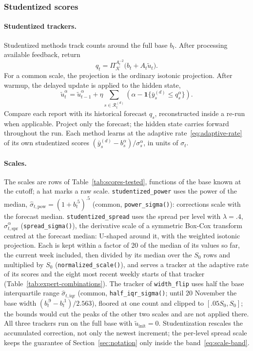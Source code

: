 \documentclass[11pt,a4paper]{article}
\newcommand{\K}{\mathcal{K}}
\newcommand{\ind}{\mathbf{1}}
\theoremstyle{definition}
\theoremstyle{remark}
\begin{document}
\subsubsection{Studentized scores}
\label{sec:studentized-code-updates}
\paragraph{Studentized trackers.}
Studentized methods track counts around the full base $b_t$. After
processing available feedback, return
\begin{equation}
 q_t=\Pi_\K^{A_t^{-2}}\bigl(b_t+A_t\tilde u_t\bigr).
 \label{eq:studentized-implementation}
\end{equation}
For a common scale, the projection is the ordinary isotonic projection.
After warmup, the delayed update is applied to the hidden state,
\begin{equation}
 \tilde u_t^\alpha
 =\tilde u_{t-1}^\alpha+
 \eta\sum_{s\in\mathcal R_t^{(d)}}
 \left(\alpha-\ind\{\bar y_s^{(d)}\le q_s^\alpha\}\right).
 \label{eq:studentized-delayed-code}
\end{equation}
Compare each report with its historical forecast $q_s$, reconstructed
inside a re-run when applicable. Project only the forecast; the hidden
state carries forward throughout the run. Each method learns at the
adaptive rate~\eqref{eq:adaptive-rate} of its own studentized scores
$(\bar y_s^{(d)}-b_s^\alpha)/\sigma_s^\alpha$, in units of $\sigma_t$.

\paragraph{Scales.}
The scales are rows of Table~\ref{tab:scores-tested}, functions of the
base known at the cutoff; a hat marks a raw scale. \texttt{studentized\_power}
uses the power of the median, $\widehat\sigma_{t,\mathrm{pow}}=(1+b_t^{.5})^{.5}$
(common, \texttt{power\_\allowbreak sigma()}): corrections scale with the
forecast median. \texttt{studentized\_spread} uses the spread per level with
$\lambda=.4$, $\widehat\sigma_{t,\mathrm{spr}}^\alpha$
(\texttt{spread\_\allowbreak sigma()}), the derivative scale of a symmetric
Box-Cox transform centred at the forecast median: U-shaped around it, with
the weighted isotonic projection. Each is kept within a factor of 20 of the
median of its values so far, the current week included, then divided by its
median over the $S_0$ rows and multiplied by $S_0$
(\texttt{normalized\_\allowbreak scale()}), and serves a tracker at the
adaptive rate of its scores and the eight most recent weekly starts of that
tracker (Table~\ref{tab:expert-combinations}). The tracker of
\texttt{width\_flip} uses half the base interquartile range
$\widehat\sigma_{t,\mathrm{iqr}}$ (common, \texttt{half\_\allowbreak iqr\_sigma()};
until 20 November the base width $(b_t^{.9}-b_t^{.1})/2.563$), floored at
one count and clipped to $[.05S_0,S_0]$; the bounds would cut the peaks of
the other two scales and are not applied there. All three trackers run on
the full base with $\tilde u_{\mathrm{init}}=0$. Studentization rescales the
accumulated correction, not only the newest increment; the per-level spread
scale keeps the guarantee of Section~\ref{sec:notation} only inside the
band~\eqref{eq:scale-band}.
\end{document}
